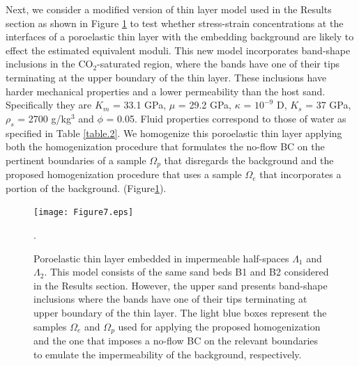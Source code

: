 \documentclass[draft]{agujournal2019}
\begin{document}
Next, we consider a modified version of thin layer model used in the Results section as shown in Figure \ref{fig.7} to test whether stress-strain concentrations at the interfaces of a poroelastic thin layer with the embedding background are likely to effect the estimated equivalent moduli. This new model incorporates band-shape inclusions in the CO$_2$-saturated region, where the bands have one of their tips terminating at the upper boundary of the thin layer. These inclusions have harder mechanical properties and a lower permeability than the host sand. Specifically they are $K_m$ = 33.1 GPa,  $\mu$ = 29.2 GPa, $\kappa$ = $10^{-9}$ D, $K_s$ = 37 GPa, $\rho_s$ = 2700 g/kg$^3$ and $\phi$ = 0.05. Fluid properties correspond to those of water as specified in Table \ref{table.2}. We homogenize this poroelastic thin layer applying both the homogenization procedure that formulates the no-flow BC on the pertinent boundaries of a sample $\Omega_p$ that disregards the background and the proposed homogenization procedure that uses a sample $\Omega_e$ that incorporates a portion of the background. (Figure\ref{fig.7}).

\begin{figure}[!ht]
\centering
        \texttt{[image: Figure7.eps]}
\caption{Poroelastic thin layer embedded in impermeable half-spaces $\Lambda_1$ and $\Lambda_2$. This model consists of the same sand beds B1 and B2 considered in the Results section. However, the upper sand presents band-shape inclusions where the bands have one of their tips terminating at upper boundary of the thin layer. The light blue boxes represent the samples $\Omega_e$ and $\Omega_p$ used for applying the proposed homogenization and the one that imposes a no-flow BC on the relevant boundaries to emulate the impermeability of the background, respectively.}. 
\label{fig.7}
\end{figure}
\end{document}
